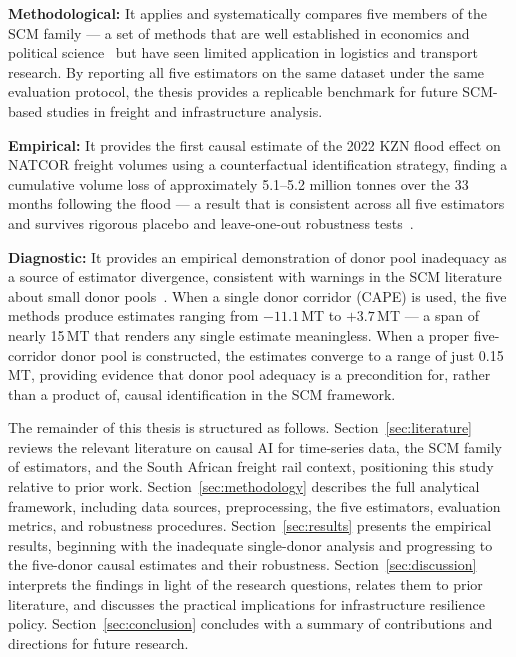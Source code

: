 \textbf{Methodological:} It applies and systematically compares five
members of the SCM family --- a set of methods that are well
established in economics and political science~\parencite{abadie2003,
abadie2010, benmichael2021, athey2021, arkhangelsky2021} but have
seen limited application in logistics and transport research.
By reporting all five estimators on the same dataset under the same
evaluation protocol, the thesis provides a replicable benchmark for
future SCM-based studies in freight and infrastructure analysis.

\textbf{Empirical:} It provides the first causal estimate of the 2022
KZN flood effect on NATCOR freight volumes using a counterfactual
identification strategy, finding a cumulative volume loss of
approximately 5.1--5.2 million tonnes over the 33 months following
the flood --- a result that is consistent across all five estimators
and survives rigorous placebo and leave-one-out robustness
tests~\parencite{abadie2010}.

\textbf{Diagnostic:} It provides an empirical demonstration of donor
pool inadequacy as a source of estimator divergence, consistent with
warnings in the SCM literature about small donor
pools~\parencite{abadie2003, benmichael2021}.
When a single donor corridor (CAPE) is used, the five methods produce
estimates ranging from $-11.1$\,MT to $+3.7$\,MT --- a span of
nearly 15\,MT that renders any single estimate meaningless.
When a proper five-corridor donor pool is constructed, the estimates
converge to a range of just 0.15\,MT, providing evidence that
donor pool adequacy is a precondition for, rather than a product of,
causal identification in the SCM framework.

The remainder of this thesis is structured as follows.
Section~\ref{sec:literature} reviews the relevant literature on causal
AI for time-series data, the SCM family of estimators, and the South
African freight rail context, positioning this study relative to prior
work.
Section~\ref{sec:methodology} describes the full analytical framework,
including data sources, preprocessing, the five estimators, evaluation
metrics, and robustness procedures.
Section~\ref{sec:results} presents the empirical results, beginning
with the inadequate single-donor analysis and progressing to the
five-donor causal estimates and their robustness.
Section~\ref{sec:discussion} interprets the findings in light of
the research questions, relates them to prior literature, and
discusses the practical implications for infrastructure resilience
policy.
Section~\ref{sec:conclusion} concludes with a summary of
contributions and directions for future research.
